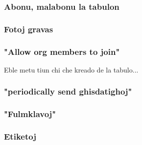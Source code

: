 \documentclass{beamer}
\begin{document}
  \begin{frame}
    \frametitle{Abonu, malabonu la tabulon}

  \end{frame}



  \begin{frame}
    \frametitle{Fotoj gravas}

  \end{frame}


  \begin{frame}
    \frametitle{"Allow org members to join"}

    Eble metu tiun chi che kreado de la tabulo...
  \end{frame}


  \begin{frame}
    \frametitle{"periodically send ghisdatighoj"}

  \end{frame}


  \begin{frame}
    \frametitle{"Fulmklavoj"}

  \end{frame}


  \begin{frame}
    \frametitle{Etiketoj}

  \end{frame}
\end{document}
